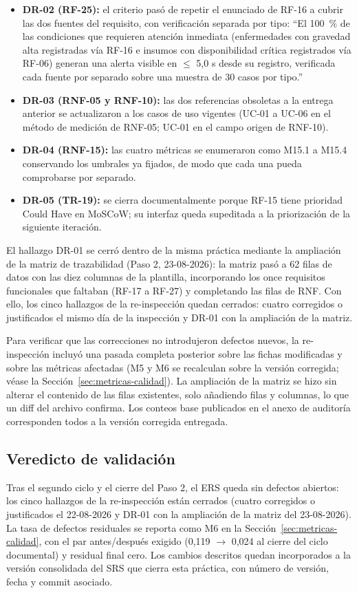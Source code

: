 \begin{itemize}
\item \textbf{DR-02 (RF-25):} el criterio pasó de repetir el enunciado de RF-16 a cubrir las dos fuentes del requisito, con verificación separada por tipo: ``El 100~\% de las condiciones que requieren atención inmediata (enfermedades con gravedad alta registradas vía RF-16 e insumos con disponibilidad crítica registrados vía RF-06) generan una alerta visible en $\leq$ 5,0 s desde su registro, verificada cada fuente por separado sobre una muestra de 30 casos por tipo.''
\item \textbf{DR-03 (RNF-05 y RNF-10):} las dos referencias obsoletas a la entrega anterior se actualizaron a los casos de uso vigentes (UC-01 a UC-06 en el método de medición de RNF-05; UC-01 en el campo origen de RNF-10).
\item \textbf{DR-04 (RNF-15):} las cuatro métricas se enumeraron como M15.1 a M15.4 conservando los umbrales ya fijados, de modo que cada una pueda comprobarse por separado.
\item \textbf{DR-05 (TR-19):} se cierra documentalmente porque RF-15 tiene prioridad Could Have en MoSCoW; su interfaz queda supeditada a la priorización de la siguiente iteración.
\end{itemize}

El hallazgo DR-01 se cerró dentro de la misma práctica mediante la ampliación de la matriz de trazabilidad (Paso 2, 23-08-2026): la matriz pasó a 62 filas de datos con las diez columnas de la plantilla, incorporando los once requisitos funcionales que faltaban (RF-17 a RF-27) y completando las filas de RNF. Con ello, los cinco hallazgos de la re-inspección quedan cerrados: cuatro corregidos o justificados el mismo día de la inspección y DR-01 con la ampliación de la matriz.

Para verificar que las correcciones no introdujeron defectos nuevos, la re-inspección incluyó una pasada completa posterior sobre las fichas modificadas y sobre las métricas afectadas (M5 y M6 se recalculan sobre la versión corregida; véase la Sección~\ref{sec:metricas-calidad}). La ampliación de la matriz se hizo sin alterar el contenido de las filas existentes, solo añadiendo filas y columnas, lo que un diff del archivo confirma. Los conteos base publicados en el anexo de auditoría corresponden todos a la versión corregida entregada.

\subsection{Veredicto de validación}
\label{sec:veredicto-validacion}

Tras el segundo ciclo y el cierre del Paso 2, el ERS queda sin defectos abiertos: los cinco hallazgos de la re-inspección están cerrados (cuatro corregidos o justificados el 22-08-2026 y DR-01 con la ampliación de la matriz del 23-08-2026). La tasa de defectos residuales se reporta como M6 en la Sección~\ref{sec:metricas-calidad}, con el par antes/después exigido (0,119 $\rightarrow$ 0,024 al cierre del ciclo documental) y residual final cero. Los cambios descritos quedan incorporados a la versión consolidada del SRS que cierra esta práctica, con número de versión, fecha y commit asociado.
